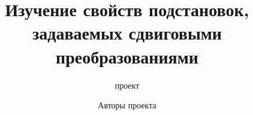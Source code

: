 
\title[Сдвиговые преобразования]{Изучение свойств подстановок, задаваемых сдвиговыми преобразованиями}
\subtitle{проект}

\author{Авторы проекта}



